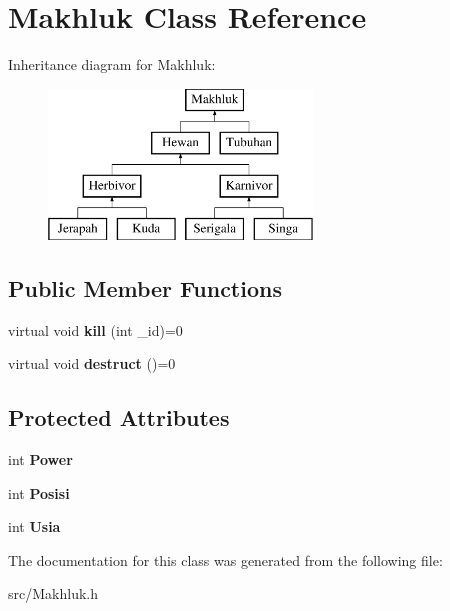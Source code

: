 \hypertarget{class_makhluk}{}\section{Makhluk Class Reference}
\label{class_makhluk}
Inheritance diagram for Makhluk\+:\begin{figure}[H]
\begin{center}
\leavevmode
\includegraphics[height=4.000000cm]{class_makhluk}
\end{center}
\end{figure}
\subsection*{Public Member Functions}
\begin{DoxyCompactItemize}
\item 
\hypertarget{class_makhluk_a4c6fd1a0b1f9d0e7cd7e2fb3ecdc8a8a}{}virtual void {\bfseries kill} (int \+\_\+id)=0\label{class_makhluk_a4c6fd1a0b1f9d0e7cd7e2fb3ecdc8a8a}

\item 
\hypertarget{class_makhluk_ac3f695aeecb35405ffdfeb2420a4751d}{}virtual void {\bfseries destruct} ()=0\label{class_makhluk_ac3f695aeecb35405ffdfeb2420a4751d}

\end{DoxyCompactItemize}
\subsection*{Protected Attributes}
\begin{DoxyCompactItemize}
\item 
\hypertarget{class_makhluk_a451e4334ec0ac1a7086a90368f55333a}{}int {\bfseries Power}\label{class_makhluk_a451e4334ec0ac1a7086a90368f55333a}

\item 
\hypertarget{class_makhluk_a4937dd4322359062bb25c67bf8c86d6a}{}int {\bfseries Posisi}\label{class_makhluk_a4937dd4322359062bb25c67bf8c86d6a}

\item 
\hypertarget{class_makhluk_aa7b08651a521198b55ca826da2682aee}{}int {\bfseries Usia}\label{class_makhluk_aa7b08651a521198b55ca826da2682aee}

\end{DoxyCompactItemize}


The documentation for this class was generated from the following file\+:\begin{DoxyCompactItemize}
\item 
src/Makhluk.\+h\end{DoxyCompactItemize}
